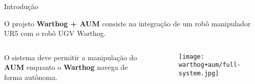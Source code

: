 \begin{frame}[t]{Introdução} 

    O projeto \textbf{Warthog + AUM} consiste na integração de um robô manipulador UR5 com o robô UGV Warthog.

    \vspace*{0.3cm}
        \begin{columns}[t]
            \begin{center}
                O sistema deve permitir a manipulação do \textbf{AUM} enquanto o \textbf{Warthog} navega de forma autônoma.
            \end{center}
            \begin{center}
                \begin{figure}
                    \texttt{[image: warthog+aum/full-system.jpg]}
                \end{figure}
            \end{center}
        \end{columns}
\end{frame}

